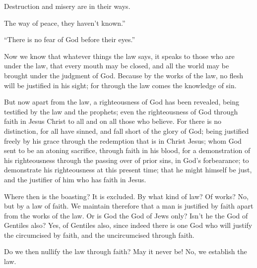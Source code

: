 {\par }{\QB {}Destruction and misery are in their ways.
\par }{\QB {}The way of peace, they haven’t known.”
\par }{\Q {}“There is no fear of God before their eyes.”
\par }{\PP {}Now we know that whatever things the law says, it speaks to those who are under the law, that every mouth may be closed, and all the world may be brought under the judgment of God.
Because by the works of the law, no flesh will be justified in his sight; for through the law comes the knowledge of sin.
\par }{\PP {}But now apart from the law, a righteousness of God has been revealed, being testified by the law and the prophets;
even the righteousness of God through faith in Jesus Christ to all and on all those who believe. For there is no distinction,
for all have sinned, and fall short of the glory of God;
being justified freely by his grace through the redemption that is in Christ Jesus;
whom God sent to be an atoning sacrifice, through faith in his blood, for a demonstration of his righteousness through the passing over of prior sins, in God’s forbearance;
to demonstrate his righteousness at this present time; that he might himself be just, and the justifier of him who has faith in Jesus.
\par }{\PP {}Where then is the boasting? It is excluded. By what kind of law? Of works? No, but by a law of faith.
We maintain therefore that a man is justified by faith apart from the works of the law.
Or is God the God of Jews only? Isn’t he the God of Gentiles also? Yes, of Gentiles also,
since indeed there is one God who will justify the circumcised by faith, and the uncircumcised through faith.
\par }{\PP {}Do we then nullify the law through faith? May it never be! No, we establish the law.

}
